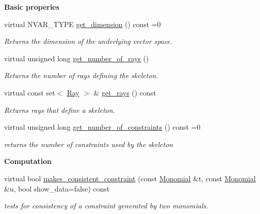 \begin{Indent}\textbf{ Basic properies}\par
\begin{DoxyCompactItemize}
\item 
\mbox{\label{group___c_l_s_solvers_a5801b4bd5322a78e0cf3dcad83383a2e}} 
virtual N\+V\+A\+R\+\_\+\+T\+Y\+PE \hyperlink{group___c_l_s_solvers_a5801b4bd5322a78e0cf3dcad83383a2e}{get\+\_\+dimension} () const =0
\begin{DoxyCompactList}\small\item\em Returns the dimension of the underlying vector space. \end{DoxyCompactList}\item 
\mbox{\label{group___c_l_s_solvers_a7a8d455722e6ae8b0bc9928dcd1bfa48}} 
virtual unsigned long \hyperlink{group___c_l_s_solvers_a7a8d455722e6ae8b0bc9928dcd1bfa48}{get\+\_\+number\+\_\+of\+\_\+rays} ()
\begin{DoxyCompactList}\small\item\em Returns the number of rays defining the skeleton. \end{DoxyCompactList}\item 
virtual const set$<$ \hyperlink{group___c_l_s_solvers_class_l_p___solvers_1_1_ray}{Ray} $>$ \& \hyperlink{group___c_l_s_solvers_a8328f67af66c81db467a6366f48ba3c8}{get\+\_\+rays} () const
\begin{DoxyCompactList}\small\item\em Returns rays that define a skeleton. \end{DoxyCompactList}\item 
virtual unsigned long \hyperlink{group___c_l_s_solvers_a1a220bc10c6d8696dd5885d7f3678e5f}{get\+\_\+number\+\_\+of\+\_\+constraints} () const =0
\begin{DoxyCompactList}\small\item\em returns the number of constraints used by the skeleton \end{DoxyCompactList}\end{DoxyCompactItemize}
\end{Indent}
\begin{Indent}\textbf{ Computation}\par
\begin{DoxyCompactItemize}
\item 
\mbox{\label{group___c_l_s_solvers_a4b2ef4e520631f5ad73d3cddffc832a1}} 
virtual bool \hyperlink{group___c_l_s_solvers_a4b2ef4e520631f5ad73d3cddffc832a1}{makes\+\_\+consistent\+\_\+constraint} (const \hyperlink{group__polygroup_class_monomial}{Monomial} \&t, const \hyperlink{group__polygroup_class_monomial}{Monomial} \&u, bool show\+\_\+data=false) const
\begin{DoxyCompactList}\small\item\em tests for consistency of a constraint generated by two monomials. \end{DoxyCompactList}\end{DoxyCompactItemize}
\end{Indent}
